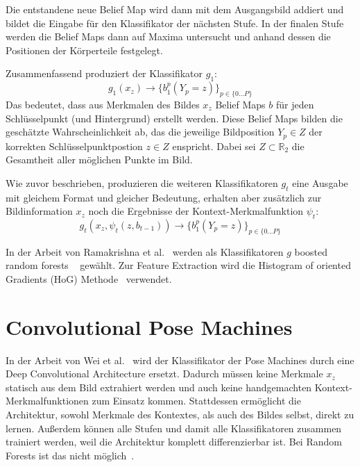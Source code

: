 \documentclass[journal, a4paper]{IEEEtran}
\begin{document}
        Die entstandene neue Belief Map wird dann mit dem Ausgangsbild addiert und bildet die Eingabe für den Klassifikator der nächsten Stufe. In der finalen Stufe werden die Belief Maps dann auf Maxima untersucht und anhand dessen die Positionen der Körperteile festgelegt.

        Zusammenfassend produziert der Klassifikator $g_1$:
        \[ g_1(x_z) \rightarrow \{b_{1}^{p}(Y_p = z) \}_{p \in \{0 \ldots P\}} \] 
        Das bedeutet, dass aus Merkmalen des Bildes $x_z$ Belief Maps $b$ für jeden Schlüsselpunkt (und Hintergrund) erstellt werden. Diese Belief Maps bilden die geschätzte Wahrscheinlichkeit ab, das die jeweilige Bildposition $Y_p \in Z$ der korrekten Schlüsselpunktpostion $z \in Z$ enspricht. Dabei sei $Z \subset \mathbb{R}_2$ die Gesamtheit aller möglichen Punkte im Bild.

        Wie zuvor beschrieben, produzieren die weiteren Klassifikatoren $g_t$ eine Ausgabe mit gleichem Format und gleicher Bedeutung, erhalten aber zusätzlich zur Bildinformation $x_z$ noch die Ergebnisse der Kontext-Merkmalfunktion $\psi_t$:
        \[ g_t(x_z,\psi_t(z,b_{t-1})) \rightarrow \{b_{1}^{p}(Y_p = z) \}_{p \in \{0 \ldots P\}} \] 

        In der Arbeit von Ramakrishna et al.~\cite{ramakrishna2014pose} werden als Klassifikatoren $g$ boosted random forests ~\cite{breiman2001,friedman2001greedy} gewählt. Zur Feature Extraction wird die Histogram of oriented Gradients (HoG) Methode~\cite{dalal2005histograms} verwendet.

\section{Convolutional Pose Machines}\label{subsec:Intro}
	In der Arbeit von Wei et al.~\cite{conv_pose} wird der Klassifikator der Pose Machines durch eine Deep Convolutional Architecture ersetzt. Dadurch müssen keine Merkmale $x_z$ statisch aus dem Bild extrahiert werden und auch keine handgemachten Kontext-Merkmalfunktionen zum Einsatz kommen. Stattdessen ermöglicht die Architektur, sowohl Merkmale des Kontextes, als auch des Bildes selbst, direkt zu lernen. Außerdem können alle Stufen und damit alle Klassifikatoren zusammen trainiert werden, weil die Architektur komplett differenzierbar ist. Bei Random Forests ist das nicht möglich~\cite{ramakrishna2014pose}.
\end{document}
